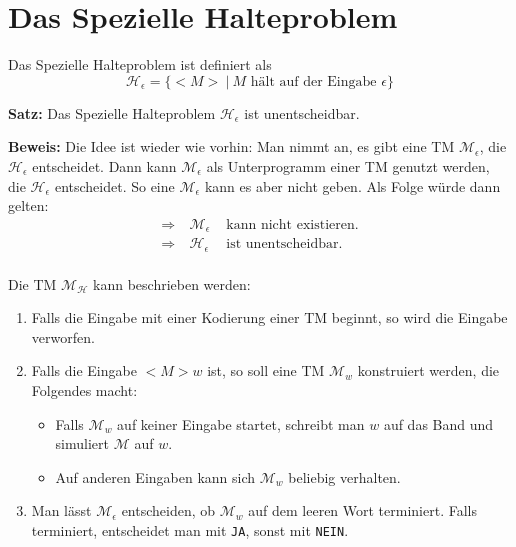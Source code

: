 \documentclass{scrartcl}%
\begin{document}
    \newpage
    \section*{Das Spezielle Halteproblem}
    Das Spezielle Halteproblem ist definiert als
    \begin{equation*}
        \mathcal{H_\epsilon} = \{ <M> \ | \ M \text{ hält auf der Eingabe } \epsilon \}
    \end{equation*}

    \vspace*{0.5cm}
    \textbf{\textsf{Satz:}} Das Spezielle Halteproblem $\mathcal{H}_\epsilon$ ist unentscheidbar.

    \vspace*{0.3cm}
    \textbf{\textsf{Beweis:}} Die Idee ist wieder wie vorhin: Man nimmt an, es gibt eine TM $\mathcal{M}_\epsilon$,
    die $\mathcal{H}_\epsilon$ entscheidet. Dann kann $\mathcal{M}_\epsilon$ als Unterprogramm einer TM genutzt werden,
    die $\mathcal{H}_\epsilon$ entscheidet. So eine $\mathcal{M}_\epsilon$ kann es aber nicht geben. Als Folge würde dann gelten:
    \begin{equation*}
        \begin{align}
            \Rightarrow \ & \mathcal{M}_\epsilon & \text{ kann nicht existieren.}\\
            \Rightarrow \ & \mathcal{H}_\epsilon & \text{ ist unentscheidbar.}\\
        \end{align}
    \end{equation*}

    Die TM $\mathcal{M}_{\mathcal{H}}$ kann beschrieben werden:
    \begin{enumerate}
        \item Falls die Eingabe mit einer Kodierung einer TM beginnt, so wird die Eingabe verworfen.
        \item Falls die Eingabe $<M>w$ ist, so soll eine TM $\mathcal{M}_w$ konstruiert werden, die Folgendes macht:
        \begin{itemize}
            \item Falls $\mathcal{M}_w$ auf keiner Eingabe startet, schreibt man $w$ auf das Band und simuliert $\mathcal{M}$ auf $w$.
            \item Auf anderen Eingaben kann sich $\mathcal{M}_w$ beliebig verhalten.
        \end{itemize}
        \item Man lässt $\mathcal{M}_\epsilon$ entscheiden, ob $\mathcal{M}_w$ auf dem leeren Wort terminiert.
        Falls terminiert, entscheidet man mit \texttt{JA}, sonst mit \texttt{NEIN}.
    \end{enumerate}
\end{document}
